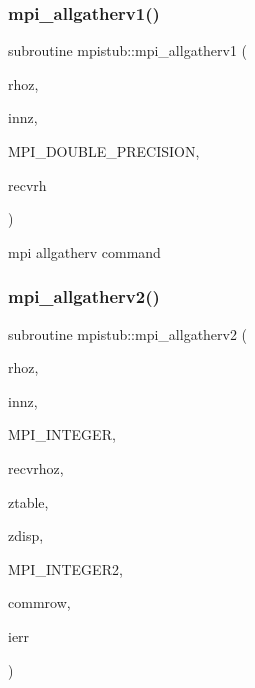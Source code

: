 \subsubsection{\texorpdfstring{mpi\_allgatherv1()}{mpi\_allgatherv1()}}
{\footnotesize\ttfamily subroutine mpistub\+::mpi\+\_\+allgatherv1 (\begin{DoxyParamCaption}\item[{double precision, dimension(\+:)}]{rhoz,  }\item[{}]{innz,  }\item[{}]{M\+P\+I\+\_\+\+D\+O\+U\+B\+L\+E\+\_\+\+P\+R\+E\+C\+I\+S\+I\+ON,  }\item[{}]{recvrh }\end{DoxyParamCaption})}



mpi allgatherv command 

\mbox{\label{namespacempistub_a107fe42e9088982af86dbfe11fe0ac33}} 
\subsubsection{\texorpdfstring{mpi\_allgatherv2()}{mpi\_allgatherv2()}}
{\footnotesize\ttfamily subroutine mpistub\+::mpi\+\_\+allgatherv2 (\begin{DoxyParamCaption}\item[{integer, dimension(\+:)}]{rhoz,  }\item[{}]{innz,  }\item[{}]{M\+P\+I\+\_\+\+I\+N\+T\+E\+G\+ER,  }\item[{integer, dimension(\+:)}]{recvrhoz,  }\item[{integer, dimension(\+:)}]{ztable,  }\item[{integer, dimension(\+:)}]{zdisp,  }\item[{}]{M\+P\+I\+\_\+\+I\+N\+T\+E\+G\+E\+R2,  }\item[{integer}]{commrow,  }\item[{}]{ierr }\end{DoxyParamCaption})}

\mbox{\label{namespacempistub_a500688889ac1b249a828fab59a1f8b5e}} 

